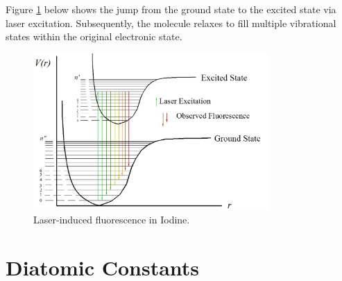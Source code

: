 \documentclass[11pt, twoside, fleqn]{report}
\begin{document}
Figure \ref{f:laser-induced_fluorescence_in_iodine} below shows the jump from the ground state to the excited state via laser excitation. Subsequently, the molecule relaxes to fill multiple vibrational states within the original electronic state.

\begin{figure}[H]
    \centering
    \includegraphics[width=0.8\textwidth]{img/lif_bands.jpg}
    \caption{Laser-induced fluorescence in Iodine.}
    \label{f:laser-induced_fluorescence_in_iodine}
\end{figure}

\appendix
\chapter{Diatomic Constants}
\label{a:diatomic_constants}
\end{document}
